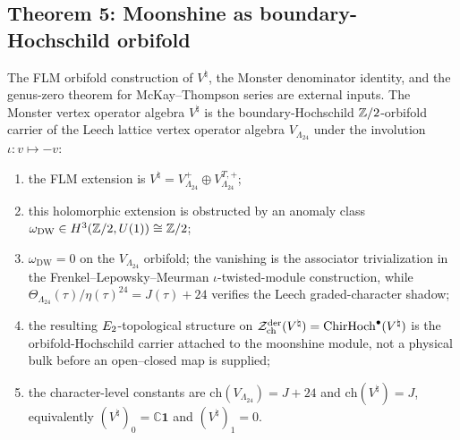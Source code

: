 \subsection{Theorem 5: Moonshine as boundary-Hochschild orbifold}
\label{sec:part-iv-thm-5}

\begin{theorem}
\label{thm:part-iv-moonshine-via-holography}
\ClaimStatusConditional
The FLM orbifold construction of $V^\natural$, the Monster
denominator identity, and the genus-zero theorem for McKay--Thompson
series are external inputs.
The Monster vertex operator algebra
$V^\natural$ \cite{Frenkel-Lepowsky-Meurman} is the
boundary-Hochschild $\mathbb{Z}/2$-orbifold carrier of the Leech lattice vertex operator
algebra $V_{\Lambda_{24}}$ under the involution
$\iota: v \mapsto -v$:
\begin{enumerate}[label=\textup{(\roman*)}, leftmargin=*]
 \item the FLM extension is
 $V^\natural=V_{\Lambda_{24}}^+\oplus V_{\Lambda_{24}}^{T,+}$;
 \item this holomorphic extension is obstructed by an anomaly
 class
 $\omega_{\mathrm{DW}} \in H^3(\mathbb{Z}/2, U(1)) \cong \mathbb{Z}/2$;
 \item $\omega_{\mathrm{DW}} = 0$ on the $V_{\Lambda_{24}}$
 orbifold; the vanishing is the associator trivialization in the
 Frenkel--Lepowsky--Meurman $\iota$-twisted-module construction,
 while
 $\Theta_{\Lambda_{24}}(\tau)/\eta(\tau)^{24}=J(\tau)+24$
 verifies the Leech graded-character shadow;
 \item the resulting $E_2$-topological structure on
 $\mathcal{Z}^{\mathrm{der}}_{\mathrm{ch}}(V^\natural) = \mathrm{ChirHoch}^\bullet(V^\natural)$ is the
 orbifold-Hochschild carrier attached to the moonshine module, not a
 physical bulk before an open--closed map is supplied;
 \item the character-level constants are
 $\mathrm{ch}(V_{\Lambda_{24}})=J+24$ and
 $\mathrm{ch}(V^\natural)=J$, equivalently
 $(V^\natural)_0=\mathbb C\mathbf 1$ and $(V^\natural)_1=0$.
\end{enumerate}
\end{theorem}
